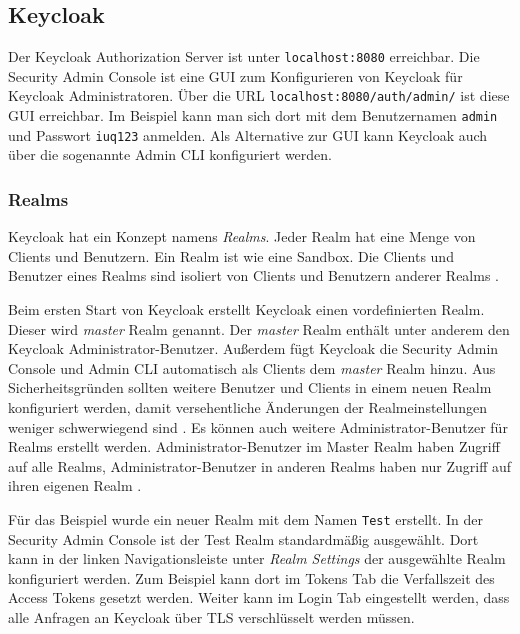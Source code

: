 \subsection{Keycloak} \label{EB_Keycloak}

Der Keycloak Authorization Server ist unter \texttt{localhost:8080} erreichbar. Die Security Admin Console ist eine GUI zum Konfigurieren von Keycloak für Keycloak Administratoren. Über die URL  \texttt{localhost:8080/auth/admin/} ist diese GUI erreichbar. Im Beispiel kann man sich dort mit dem Benutzernamen \texttt{admin} und Passwort \texttt{iuq123} anmelden. Als Alternative zur GUI kann Keycloak auch über die sogenannte Admin CLI konfiguriert werden.

\subsubsection{Realms}\label{EB_Realms}

Keycloak hat ein Konzept namens \textit{Realms}. Jeder Realm hat eine Menge von Clients und Benutzern. Ein Realm ist wie eine Sandbox. Die Clients und Benutzer eines Realms sind isoliert von Clients und Benutzern anderer Realms \cite[Core Concepts and Terms]{SSEB_keycloakDocs}.

Beim ersten Start von Keycloak erstellt Keycloak einen vordefinierten Realm. Dieser wird \textit{master} Realm genannt. Der \textit{master} Realm enthält unter anderem den Keycloak Administrator-Benutzer. Außerdem fügt Keycloak die Security Admin Console und Admin CLI automatisch als Clients dem \textit{master} Realm hinzu. Aus Sicherheitsgründen sollten weitere Benutzer und Clients in einem neuen Realm konfiguriert werden, damit versehentliche Änderungen der Realmeinstellungen weniger schwerwiegend sind \cite[Master Realm]{SSEB_keycloakDocs}. Es können auch weitere Administrator-Benutzer für Realms erstellt werden. Administrator-Benutzer im Master Realm haben Zugriff auf alle Realms,  Administrator-Benutzer in anderen Realms haben nur Zugriff auf ihren eigenen Realm \cite[Master Realm]{SSEB_keycloakDocs}.

Für das Beispiel wurde ein neuer Realm mit dem Namen \texttt{Test} erstellt. In der Security Admin Console ist der Test Realm standardmäßig ausgewählt. Dort kann in der linken Navigationsleiste unter \textit{Realm Settings} der ausgewählte Realm konfiguriert werden. Zum Beispiel kann dort im Tokens Tab die Verfallszeit des Access Tokens gesetzt werden. Weiter kann im Login Tab eingestellt werden, dass alle Anfragen an Keycloak über TLS verschlüsselt werden müssen.

